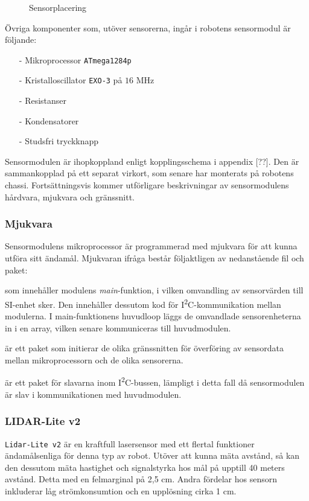 \documentclass[11pt]{article}
\begin{document}
\begin{flushleft}
\begin{figure}[htbp]
\centering
\noindent\resizebox{.8\textwidth}{!}{
		}
	\caption{Sensorplacering \label{sensors}}
\end{figure}

Övriga komponenter som, utöver sensorerna, ingår i robotens sensormodul är följande:
\begin{itemize}
  \item[-] Mikroprocessor \verb+ATmega1284p+
  \item[-] Kristalloscillator \verb+EXO-3+ på $16$ MHz
  \item[-] Resistanser
  \item[-] Kondensatorer
  \item[-] Studsfri tryckknapp
\end{itemize}

Sensormodulen är ihopkoppland enligt kopplingsschema i appendix [??]. Den är sammankopplad på ett separat virkort, som senare har monterats på robotens chassi. Fortsättningsvis kommer utförligare beskrivningar av sensormodulens hårdvara, mjukvara och gränssnitt.


\subsubsection{Mjukvara}
Sensormodulens mikroprocessor är programmerad med mjukvara för att kunna utföra sitt ändamål. Mjukvaran ifråga består följaktligen av nedanstående fil och paket: 

\begin{description}[style=unboxed, leftmargin=0cm]
  \item[sensorModule.c] som innehåller modulens \textit{main}-funktion, i vilken omvandling av sensorvärden till SI-enhet sker. Den innehåller dessutom kod för I\textsuperscript{2}C-kommunikation mellan modulerna. I main-funktionens huvudloop läggs de omvandlade sensorenheterna in i en array, vilken senare kommuniceras till huvudmodulen.
  \item[sensorInit.h] är ett paket som initierar de olika gränssnitten för överföring av sensordata mellan mikroprocessorn och de olika sensorerna.
  \item[I2C\_slave.h] är ett paket för slavarna inom I\textsuperscript{2}C-bussen, lämpligt i detta fall då sensormodulen är slav i kommunikationen med huvudmodulen.
\end{description}

\subsubsection{LIDAR-Lite v2}
\verb+Lidar-Lite v2+ är en kraftfull lasersensor med ett flertal funktioner ändamålsenliga för denna typ av robot. Utöver att kunna mäta avstånd, så kan den dessutom mäta hastighet och signalstyrka hos mål på upptill 40 meters avstånd. Detta med en felmarginal på 2,5 cm. Andra fördelar hos sensorn inkluderar låg strömkonsumtion och en upplösning cirka 1 cm.


\end{flushleft}
\end{document}
